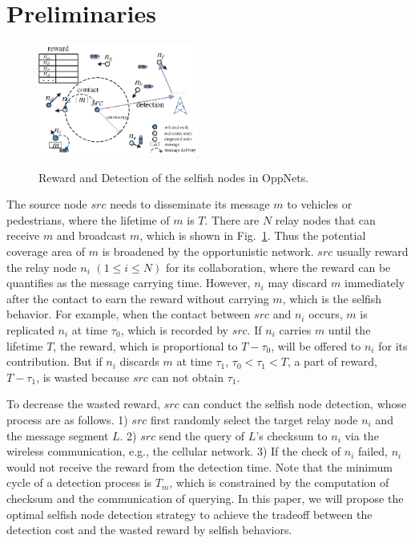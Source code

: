 \section{Preliminaries}
\label{sec:preli}
\begin{figure}
  \centering
  {\includegraphics[width=0.47\textwidth]{fig/sketch.eps}}
     \caption{Reward and Detection of the selfish nodes in OppNets.}
     \label{fig:sketch}
\end{figure}
The source node $src$ needs to disseminate its message $m$
to vehicles or pedestrians,
where the lifetime of $m$ is $T$.
There are $N$ relay nodes that can receive $m$ and broadcast $m$,
which is shown in Fig.~\ref{fig:sketch}.
Thus the potential coverage area of $m$ 
is broadened by the opportunistic network.
$src$ usually reward the relay node 
$n_{i}$ $(1 \le i \le N)$ for its collaboration,
where the reward can be quantifies as the message carrying time.
However, $n_{i}$ may discard $m$ immediately after the contact
to earn the reward without carrying $m$,
which is the selfish behavior.
For example, when the contact between $src$ and $n_{i}$ occurs,
$m$ is replicated $n_{i}$ at time $\tau_{0}$, which is recorded by $src$.
If $n_{i}$ carries $m$ until the lifetime $T$,
the reward, which is proportional to $T-\tau_{0}$,
will be offered to $n_{i}$ for its contribution.
But if $n_{i}$ discards $m$ at time $\tau_{1}$,
$\tau_{0} < \tau_{1} < T$,
a part of reward, $T-\tau_{1}$, is wasted
because $src$ can not obtain $\tau_{1}$.

To decrease the wasted reward,
$src$ can conduct the selfish node detection,
whose process are as follows.
1) $src$ first randomly select the target relay node $n_{i}$ 
and the message segment $L$.
2) $src$ send the query of $L$'s checksum to $n_{i}$ 
via the wireless communication, e.g., the cellular network.
3) If the check of $n_{i}$ failed,
$n_{i}$ would not receive the reward from the detection time.
Note that the minimum cycle of a detection process is $T_{m}$,
which is constrained by the computation of checksum and 
the communication of querying.
In this paper, we will propose the optimal selfish node detection strategy
to achieve the tradeoff between the detection cost 
and the wasted reward by selfish behaviors.

